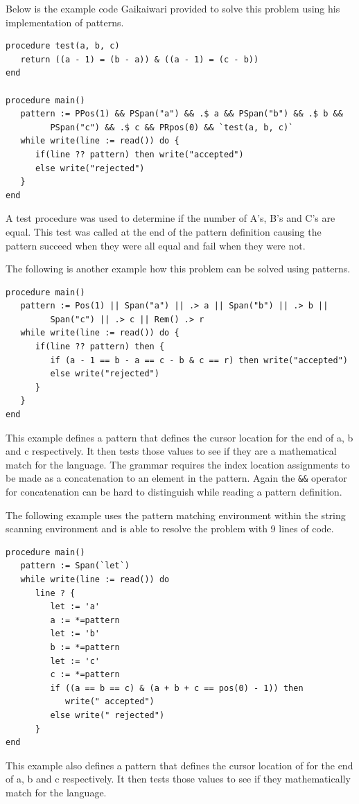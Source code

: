 \documentclass{article}
\begin{document}
Below is the example code Gaikaiwari provided to solve this problem using his implementation of patterns.  
\begin{verbatim}
procedure test(a, b, c)
   return ((a - 1) = (b - a)) & ((a - 1) = (c - b))
end

procedure main()
   pattern := PPos(1) && PSpan("a") && .$ a && PSpan("b") && .$ b && 
         PSpan("c") && .$ c && PRpos(0) && `test(a, b, c)`
   while write(line := read()) do {
      if(line ?? pattern) then write("accepted")
      else write("rejected")
   }
end
\end{verbatim}
A test procedure was used to determine if the number of A's, B's and C's are equal.  This test was called at the end of the pattern definition causing the pattern succeed when they were all equal and fail when they were not.

The following is another example how this problem can be solved using patterns.
\begin{verbatim}
procedure main()
   pattern := Pos(1) || Span("a") || .> a || Span("b") || .> b || 
         Span("c") || .> c || Rem() .> r
   while write(line := read()) do {
      if(line ?? pattern) then {
         if (a - 1 == b - a == c - b & c == r) then write("accepted")
         else write("rejected")
      }
   }
end
\end{verbatim}
This example defines a pattern that defines the cursor location for the end of a, b and c respectively.  It then tests those values to see if they are a mathematical match for the language.  The grammar requires the index location assignments to be made as a concatenation to an element in the pattern.  Again the \texttt{\&\&} operator for concatenation can be hard to distinguish while reading a pattern definition.

The following example uses the pattern matching environment within the string scanning environment and is able to resolve the problem with 9 lines of code.
\begin{verbatim}
procedure main()
   pattern := Span(`let`)
   while write(line := read()) do
      line ? {
         let := 'a'
         a := *=pattern
         let := 'b'
         b := *=pattern
         let := 'c'
         c := *=pattern
         if ((a == b == c) & (a + b + c == pos(0) - 1)) then 
            write(" accepted")
         else write(" rejected")
      }
end
\end{verbatim}
This example also defines a pattern that defines the cursor location of for the end of a, b and c respectively.  It then tests those values to see if they mathematically match for the language.
\end{document}
